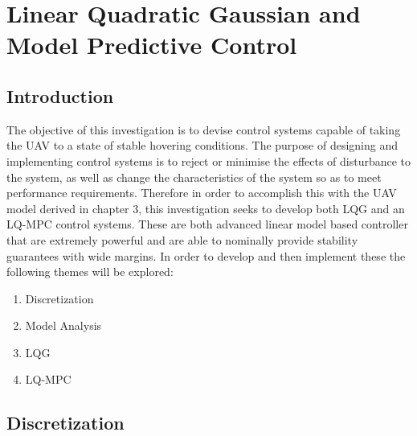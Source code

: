\documentclass[12pt,a4paper,twoside]{report}
\begin{document}
			\newpage
			
	\chapter{Linear Quadratic Gaussian and Model Predictive Control}
		
		\section{Introduction}
		
			The objective of this investigation is to devise control systems capable of taking the UAV to a state of stable hovering conditions. The purpose of designing and implementing control systems is to reject or minimise the effects of disturbance to the system, as well as change the characteristics of the system so as to meet performance requirements. Therefore in order to accomplish this with the UAV model derived in chapter 3, this investigation seeks to develop both LQG and an LQ-MPC control systems. These are both advanced linear model based controller that are extremely powerful and are able to nominally provide stability guarantees with wide margins. In order to develop and then implement these the following themes will be explored:
		 
			\begin{enumerate}
				\item 
					Discretization
				\item 
					Model Analysis
				\item 
					LQG
				\item
					LQ-MPC
			\end{enumerate}
		
		\section{Discretization}
		
\end{document}
